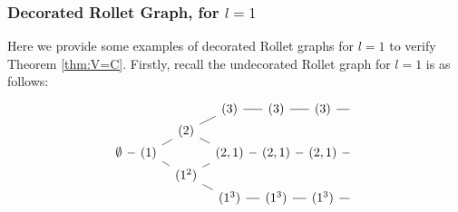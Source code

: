 \documentclass{article}
\newcommand{\ppm}[1]{\textcolor{red}{#1}}
\theoremstyle{definition}
\def\l{\lambda}
\numberwithin{equation}{subsection}
\begin{document}
\subsubsection{Decorated Rollet Graph, for $l=1$} \label{ss:DRG1}
Here we provide some examples of decorated Rollet graphs for $l=1$ to verify Theorem \ref{thm:V=C}. Firstly, recall the undecorated Rollet graph for $l=1$ is as follows:
\[
\begin{tikzcd}[column sep=0.6em,row sep=0em]
&&&(3)\ar[dash,r]&(3)\ar[dash,r]&(3)\ar[dash,r]&{}\\
&&(2)\arrow[dash,ur]\arrow[dash,dr]\\
\emptyset\arrow[dash,r] & (1)\arrow[dash,ur]\arrow[dash,dr] &&(2,1)\ar[dash,r]&(2,1)\ar[dash,r]&(2,1)\ar[dash,r]&{}\\
&&(1^2)\arrow[dash,ur]\arrow[dash,dr]\\
&&&(1^3)\ar[dash,r]&(1^3)\ar[dash,r]&(1^3)\ar[dash,r]&{}
\end{tikzcd}
\]
\end{document}
